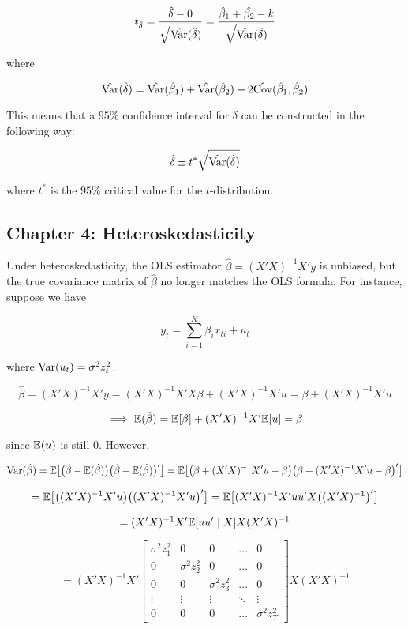 \[
t_{\hat{\delta}} = \frac{\hat{\delta}  - 0}{\sqrt{\hat{\Var}(\hat{\delta})}} = \frac{\hat{\beta}_1 + \hat{\beta_2} -k}{\sqrt{\hat{\Var}(\hat{\delta})}}
\]

where

\[
\hat{\Var}(\hat{\delta}) = \hat{\Var}(\hat{\beta}_1) + \hat{\Var}(\hat{\beta}_2) + 2 \hat{\Cov}(\hat{\beta}_1, \hat{\beta}_2) 
\]

This means that a \(95\%\) confidence interval for \(\delta\) can be constructed in the following way:

\[
\hat{\delta} \pm t^* \sqrt{\hat{\Var}(\hat{\delta})}
\]

where \(t^*\) is the \(95\%\) critical value for the \(t\)-distribution.

\subsection{Chapter 4: Heteroskedasticity}

Under heteroskedasticity, the OLS estimator \(\hat{\beta} = (X'X)^{-1}X'y\) is unbiased, but the true covariance matrix of \(\hat{\beta}\) no longer matches the OLS formula. For instance, suppose we have

\[
y_t = \sum_{i=1}^K \beta_i x_{ti} + u _t
\]

where \(\Var(u_t) = \sigma^2 z_t^2\).

\[
\hat{\beta} = (X'X)^{-1}X'y = (X'X)^{-1}X'X\beta + (X'X)^{-1}X'u = \beta + (X'X)^{-1}X'u 
\]


\[
\implies \E(\hat{\beta}) = \E[\beta] + (X'X)^{-1}X'\E[u] = \beta
\]

since \(\E(u)\) is still 0. However,

\[
\Var(\hat{\beta}) = \E\big[ \big(\hat{\beta} - \E(\hat{\beta}) \big) \big(\hat{\beta} - \E(\hat{\beta}) \big)' \big] = \E \big[\big(\beta + (X'X)^{-1}X'u - \beta \big)\big(\beta + (X'X)^{-1}X'u - \beta \big)' \big]
\]

\[
= \E \big[\big((X'X)^{-1}X'u\big)\big((X'X)^{-1}X'u \big) '\big] = \E \big[ (X'X)^{-1}X'uu'X\big((X'X)^{-1}\big)' \big]
\]

\[
= (X'X)^{-1}X' \E[uu' \mid X] X(X'X)^{-1}
\]

\[
= (X'X)^{-1}X' \begin{bmatrix}
    \sigma^2 z_1^2 &0 & 0 & \dots & 0 \\
   0 & \sigma^2 z_2^2 &0 & \dots  & 0 \\
   0 & 0 & \sigma^2 z_3^2 & \dots  & 0 \\
    \vdots & \vdots & \vdots & \ddots & \vdots \\
    0 & 0 &0 & \dots  & \sigma^2 z_T^2
\end{bmatrix}  X(X'X)^{-1}
\]

